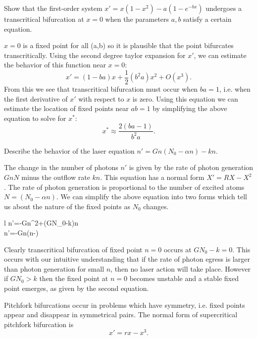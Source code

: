 \documentclass{article}
\begin{document}
\begin{example}
	Show that the first-order system \(x'=x(1-x^2)-a(1-e^{-bx})\) undergoes a transcritical bifurcation at \(x=0\) when the parameters \(a,b\) satisfy a certain equation.
	\begin{IEEEproof}
		\(x=0\) is a fixed point for all (a,b) so it is plausible that the point bifurcates transcritically. Using the second degree taylor expansion for \(x'\), we can estimate the behavior of this function near \(x=0\):
		\begin{equation*}
			x'=(1-ba)x+\frac{1}{2}(b^2a)x^2+O(x^3).
		\end{equation*}
	From this we see that transcritical bifurcation must occur when \(ba=1\), i.e. when the first derivative of \(x'\) with respect to \(x\) is zero. Using this equation we can estimate the location of fixed points near \(ab=1\) by simplifying the above equation to solve for \(x^*\):
		\begin{equation*}
			x^*\approx\frac{2(ba-1)}{b^2a}.
		\end{equation*}
	\end{IEEEproof}
\end{example}
\begin{example}
	Describe the behavior of the laser equation \(n'=Gn(N_0-\alpha n)-kn\).
	\begin{IEEEproof}
		The change in the number of photons \(n'\) is given by the rate of photon generation \(GnN\) minus the outflow rate \(kn\). This equation has a normal form \(X'=RX-X^2\). The rate of photon generation is proportional to the number of excited atoms \(N=(N_0-\alpha n)\). We can simplify the above equation into two forms which tell us about the nature of the fixed points as \(N_0\) changes.
		\begin{IEEEeqnarray*}{l}
			n'=-G\alpha n^2+(GN_0-k)n\\
			n'=-G\alpha n\bigg(n-\bigg)
		\end{IEEEeqnarray*}
		Clearly transcritical bifurcation of fixed point \(n=0\) occurs at \(GN_0-k=0\). This occurs with our intuitive understanding that if the rate of photon egress is larger than photon generation for small \(n\), then no laser action will take place. However if \(GN_0>k\) then the fixed point at \(n=0\) becomes unstable and a stable fixed point emerges, as given by the second equation.
	\end{IEEEproof}
\end{example}
\begin{definition}
	Pitchfork bifurcations occur in problems which have symmetry, i.e. fixed points appear and disappear in symmetrical pairs. The normal form of supercritical pitchfork bifurcation is
	\begin{equation*}
		x'=rx-x^3.
	\end{equation*}
\end{definition}
\end{document}
